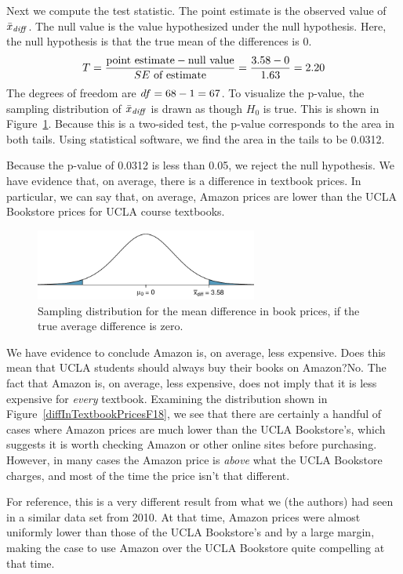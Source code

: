 Next we compute the test statistic.  The point estimate is the observed value of $\bar{x}_{\text{\emph{diff}}}$.  The null value is the value hypothesized under the null hypothesis.  Here, the null hypothesis is that the true mean of the differences is 0.  
\begin{align*}
T
  = \frac{\text{point estimate} - \text{null value}}
      {SE \text{ of estimate}}
  = \frac{3.58{} - 0}{1.63{}} = 2.20
\end{align*}
The degrees of freedom are $df = 68{} - 1 = 67$.
To visualize the p-value, the sampling distribution
of $\bar{x}_{\text{\emph{diff}}}$ is drawn as though
$H_0$ is true.  This is shown in
Figure~\ref{textbooksF18HTTails}.  Because this is a two-sided test, the p-value corresponds to the area in both tails.  Using statistical software, we find the area in the tails to be 0.0312.

Because the p-value of 0.0312 is less than 0.05,
we reject the null hypothesis.  We have evidence that, on average, there is a difference in textbook prices.  In particular, we can say that, on average, Amazon prices are lower than the
UCLA Bookstore prices for UCLA course textbooks.


\begin{figure}[h]
\centering
\includegraphics[width=0.65\textwidth]{ch_inference_for_means/figures/textbooksF18/textbooksF18HTTails}
\caption{Sampling distribution for the mean difference in book prices, if the true average difference is zero.}
\label{textbooksF18HTTails}
\end{figure}

\begin{examplewrap}
\begin{nexample}{We have evidence to conclude Amazon is,
on average, less expensive. Does this mean that UCLA students should always buy their books
on Amazon?}No. The fact that Amazon is, on average, less expensive, does not imply that it is less expensive for \emph{every} textbook.  Examining the distribution shown in
  Figure~\ref{diffInTextbookPricesF18}, we see that there are certainly a handful of cases where
  Amazon prices are much lower than the UCLA Bookstore's,
  which suggests it is worth checking Amazon
  or other online sites before purchasing.
  However, in many cases the Amazon price is
  \emph{above} what the UCLA Bookstore charges,
  and most of the time the price isn't that different.  
\end{nexample}
\end{examplewrap}
  For reference, this is a very different result
  from what we (the authors) had seen in a similar
  data set from 2010.
  At that time, Amazon prices were almost uniformly
  lower than those of the UCLA Bookstore's and by
  a large margin, making the case to use Amazon over
  the UCLA Bookstore quite compelling at that time.

